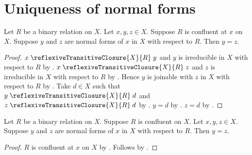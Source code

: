 


\section{Uniqueness of normal forms}

\begin{theorem}\label{confluent_at_normal_forms_unique}
    Let $R$ be a binary relation on $X$.
    Let $x,y,z\in X$.
    Suppose $R$ is confluent at $x$ on $X$.
    Suppose $y$ and $z$ are normal forms of $x$ in $X$ with respect to $R$.
    Then $y=z$.
\end{theorem}
\begin{proof}
    $x\mathrel{\reflexiveTransitiveClosure{X}{R}}y$ and
        $y$ is irreducible in $X$ with respect to $R$
        by .
    $x\mathrel{\reflexiveTransitiveClosure{X}{R}}z$ and
        $z$ is irreducible in $X$ with respect to $R$
        by .
    Hence $y$ is joinable with $z$ in $X$ with respect to $R$
        by .
    Take $d\in X$ such that
        $y\mathrel{\reflexiveTransitiveClosure{X}{R}}d$ and
        $z\mathrel{\reflexiveTransitiveClosure{X}{R}}d$
        by .
    $y=d$ by .
    $z=d$ by .
\end{proof}

\begin{corollary}\label{confluent_on_normal_forms_unique}
    Let $R$ be a binary relation on $X$.
    Suppose $R$ is confluent on $X$.
    Let $x,y,z\in X$.
    Suppose $y$ and $z$ are normal forms of $x$ in $X$ with respect to $R$.
    Then $y=z$.
\end{corollary}
\begin{proof}
    $R$ is confluent at $x$ on $X$ by .
    Follows by .
\end{proof}
